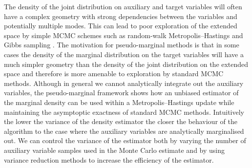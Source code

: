 The density of the joint distribution on auxiliary and target variables will often have a complex geometry with strong dependencies between the variables and potentially multiple modes. This can lead to poor exploration of the extended space by simple \ac{MCMC} schemes such as random-walk Metropolis--Hastings and Gibbs sampling \citep{andrieu2009pseudo}. The motivation for pseudo-marginal methods is that in some cases the density of the marginal distribution on the target variables will have a much simpler geometry than the density of the joint distribution on the extended space and therefore is more amenable to exploration by standard \ac{MCMC} methods. Although in general we cannot analytically integrate out the auxiliary variables, the pseudo-marginal framework shows how an unbiased estimator of the marginal density can be used within a Metropolis--Hastings update while maintaining the asymptoptic exactness of standard \ac{MCMC} methods.  Intuitively the lower the variance of the density estimator the closer the behaviour of the algorithm to the case where the auxiliary variables are analytically marginalised out. We can control the variance of the estimator both by varying the number of auxiliary variable samples used in the Monte Carlo estimate and by using variance reduction methods to increase the efficiency of the estimator.



